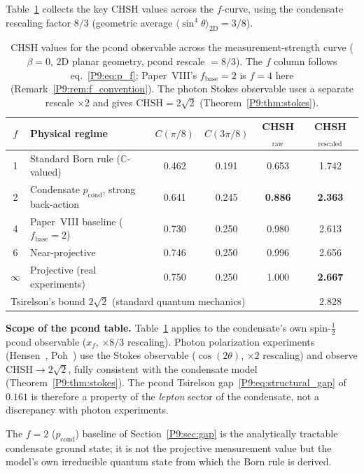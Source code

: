 \documentclass[11pt,a4paper]{article}
\theoremstyle{definition}
\theoremstyle{remark}
\newcommand{\CC}{\mathbb{C}}
\newcommand{\pcond}{p_{\mathrm{cond}}}
\newcommand{\CHSH}{\mathrm{CHSH}}
\begin{document}
Table~\ref{P9:tab:chsh_f} collects the key CHSH values across the
$f$-curve, using the condensate rescaling factor $8/3$
(geometric average $\langle\sin^4\theta\rangle_{2\mathrm{D}}=3/8$).
 
\begin{table}[h]
\centering
\caption{CHSH values for the pcond observable across the
measurement-strength curve ($\beta=0$, 2D planar geometry,
pcond rescale $=8/3$). The $f$ column follows eq.~\eqref{P9:eq:p_f};
Paper~VIII's $f_\mathrm{base}=2$ is $f=4$ here
(Remark~\ref{P9:rem:f_convention}).
The photon Stokes observable uses a separate rescale $\times2$
and gives $\CHSH=2\sqrt{2}$ (Theorem~\ref{P9:thm:stokes}).}
\label{P9:tab:chsh_f}
\begin{tabular}{clcccc}
\toprule
$f$ & Physical regime & $C(\pi/8)$ & $C(3\pi/8)$ & CHSH$_\mathrm{raw}$ & CHSH$_\mathrm{rescaled}$ \\
\midrule
1   & Standard Born rule ($\CC$-valued) & 0.462 & 0.191 & 0.653 & 1.742 \\
2   & Condensate $\pcond$, strong back-action & 0.641 & 0.245 & \textbf{0.886} & \textbf{2.363} \\
4   & Paper~VIII baseline ($f_\mathrm{base}=2$) & 0.730 & 0.250 & 0.980 & 2.613 \\
6   & Near-projective & 0.746 & 0.250 & 0.996 & 2.656 \\
$\infty$ & Projective (real experiments) & 0.750 & 0.250 & 1.000 & \textbf{2.667} \\
\midrule
\multicolumn{4}{l}{Tsirelson's bound $2\sqrt{2}$ (standard quantum mechanics)} & & $\mathbf{2.828}$ \\
\bottomrule
\end{tabular}
\end{table}
 
\textbf{Scope of the pcond table.}
Table~\ref{P9:tab:chsh_f} applies to the condensate's own spin-$\tfrac{1}{2}$
pcond observable ($x_f$, $\times8/3$ rescaling).
Photon polarization experiments (Hensen~\cite{Hensen2015},
Poh~\cite{Poh2015}) use the Stokes observable ($\cos(2\theta)$,
$\times2$ rescaling) and observe $\CHSH\to2\sqrt{2}$,
fully consistent with the condensate model (Theorem~\ref{P9:thm:stokes}).
The pcond Tsirelson gap~\eqref{P9:eq:structural_gap} of $0.161$
is therefore a property of the \emph{lepton} sector of the condensate,
not a discrepancy with photon experiments.
 
The $f=2$ ($\pcond$) baseline of Section~\ref{P9:sec:gap}
is the analytically tractable condensate ground state;
it is not the projective measurement value but the model's own
irreducible quantum state from which the Born rule is derived.
\end{document}
